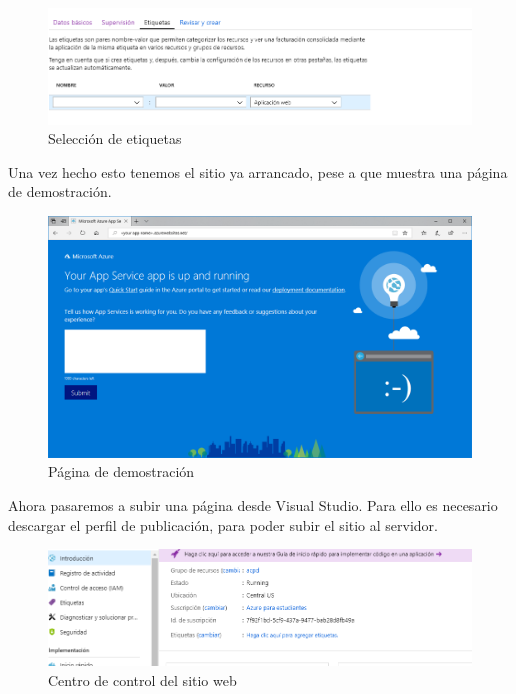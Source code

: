\newpage
\begin{figure}[h]
	\centering
	\includegraphics[scale=0.55]{web_azure/creacion3.png}
	\caption{Selección de etiquetas}
	\label{AZWEB3}
\end{figure}

Una vez hecho esto tenemos el sitio ya arrancado, pese a que muestra una página de demostración.

\begin{figure}[h]
	\centering
	\includegraphics[scale=0.4]{web_azure/web1.png}
	\caption{Página de demostración}
	\label{AZWEB4}
\end{figure}

\newpage
Ahora pasaremos a subir una página desde Visual Studio. Para ello es necesario descargar el perfil de publicación, para poder subir el sitio al servidor.

\begin{figure}[h]
	\centering
	\includegraphics[scale=0.55]{web_azure/centro.png}
	\caption{Centro de control del sitio web}
	\label{AZWEB5}
\end{figure}

